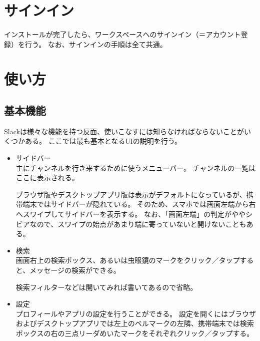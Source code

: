 \documentclass[lualatex,ja=standard,12pt,a4j]{bxjsbook}
\begin{document}
		\section{サインイン\label{signin}}
        	インストールが完了したら、ワークスペースへのサインイン（＝アカウント登録）を行う。
            なお、サインインの手順は全て共通。
            
            
   		\section{使い方}
        	\subsection{基本機能}
            	Slackは様々な機能を持つ反面、使いこなすには知らなければならないことがいくつかある。
                ここでは最も基本となるUIの説明を行う。
                \begin{itemize}
                	\item サイドバー\\
                    	主にチャンネルを行き来するために使うメニューバー。
                        チャンネルの一覧はここに表示される。
                        
                        ブラウザ版やデスクトップアプリ版は表示がデフォルトになっているが、携帯端末ではサイドバーが隠れている。
                        そのため、スマホでは画面左端から右へスワイプしてサイドバーを表示する。
                        なお、「画面左端」の判定がややシビアなので、スワイプの始点があまり端に寄っていないと開けないこともある。
                    \item 検索\\
                    	画面右上の検索ボックス、あるいは虫眼鏡のマークをクリック／タップすると、メッセージの検索ができる。
                        
                        検索フィルターなどは開いてみれば書いてあるので省略。
                    \item 設定\\
                    	プロフィールやアプリの設定を行うことができる。
                        設定を開くにはブラウザおよびデスクトップアプリでは左上のベルマークの左隣、携帯端末では検索ボックスの右の三点リーダめいたマークをそれぞれクリック／タップする。
                \end{itemize}
            
\end{document}
